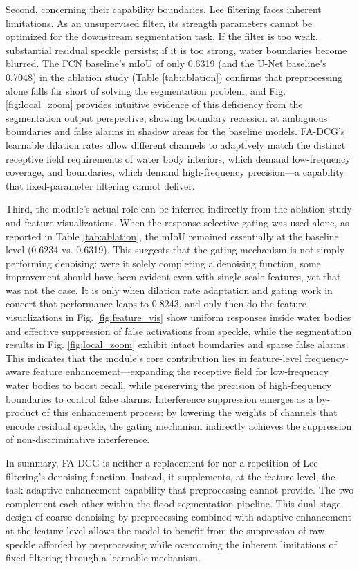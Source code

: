 \documentclass[lettersize,journal]{IEEEtran}
\begin{document}
Second, concerning their capability boundaries, Lee filtering faces inherent limitations. As an unsupervised filter, its strength parameters cannot be optimized for the downstream segmentation task. If the filter is too weak, substantial residual speckle persists; if it is too strong, water boundaries become blurred. The FCN baseline's mIoU of only 0.6319 (and the U-Net baseline's 0.7048) in the ablation study (Table \ref{tab:ablation}) confirms that preprocessing alone falls far short of solving the segmentation problem, and Fig. \ref{fig:local_zoom} provides intuitive evidence of this deficiency from the segmentation output perspective, showing boundary recession at ambiguous boundaries and false alarms in shadow areas for the baseline models. FA-DCG's learnable dilation rates allow different channels to adaptively match the distinct receptive field requirements of water body interiors, which demand low-frequency coverage, and boundaries, which demand high-frequency precision---a capability that fixed-parameter filtering cannot deliver.

Third, the module's actual role can be inferred indirectly from the ablation study and feature visualizations. When the response-selective gating was used alone, as reported in Table \ref{tab:ablation}, the mIoU remained essentially at the baseline level (0.6234 vs. 0.6319). This suggests that the gating mechanism is not simply performing denoising: were it solely completing a denoising function, some improvement should have been evident even with single-scale features, yet that was not the case. It is only when dilation rate adaptation and gating work in concert that performance leaps to 0.8243, and only then do the feature visualizations in Fig. \ref{fig:feature_vis} show uniform responses inside water bodies and effective suppression of false activations from speckle, while the segmentation results in Fig. \ref{fig:local_zoom} exhibit intact boundaries and sparse false alarms. This indicates that the module's core contribution lies in feature-level frequency-aware feature enhancement---expanding the receptive field for low-frequency water bodies to boost recall, while preserving the precision of high-frequency boundaries to control false alarms. Interference suppression emerges as a by-product of this enhancement process: by lowering the weights of channels that encode residual speckle, the gating mechanism indirectly achieves the suppression of non-discriminative interference.

In summary, FA-DCG is neither a replacement for nor a repetition of Lee filtering's denoising function. Instead, it supplements, at the feature level, the task-adaptive enhancement capability that preprocessing cannot provide. The two complement each other within the flood segmentation pipeline. This dual-stage design of coarse denoising by preprocessing combined with adaptive enhancement at the feature level allows the model to benefit from the suppression of raw speckle afforded by preprocessing while overcoming the inherent limitations of fixed filtering through a learnable mechanism.
\end{document}
